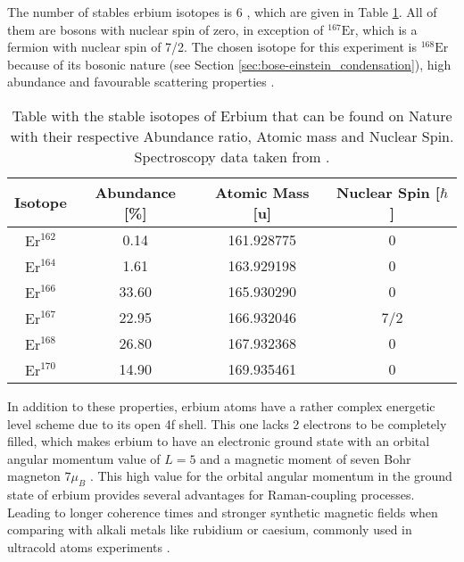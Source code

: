 The number of stables erbium isotopes is 6 , which are given in Table \ref{tab:Isotopes_Erbium}. All of them are bosons with nuclear spin of zero, in exception of $^{\text{167}}\text{Er}$, which is a fermion with nuclear spin of 7/2. The chosen isotope for this experiment is $^{\text{168}}\text{Er}$ because of its bosonic nature (see Section \ref{sec:bose-einstein_condensation}), high abundance and favourable scattering properties \cite{Frisch2014}.

\begin{table}[htbp] \centering
	\begin{tabular}{@{}c|c|c|c@{}}\hline
		Isotope                  & Abundance [\%]          & Atomic Mass [u] & Nuclear Spin [$\hbar$] \\ \hline\hline
		$\text{Er}^{\text{162}}$ &  0.14                   & 161.928775      & 0   \\
		$\text{Er}^{\text{164}}$ &  1.61                   & 163.929198      & 0   \\ 
		$\text{Er}^{\text{166}}$ & 33.60                   & 165.930290      & 0   \\
		$\text{Er}^{\text{167}}$ & 22.95                   & 166.932046      & 7/2   \\
		$\text{Er}^{\text{168}}$ & 26.80                   & 167.932368      & 0   \\  
		$\text{Er}^{\text{170}}$ & 14.90                   & 169.935461      & 0   \\  \hline
	\end{tabular}
	\caption[Table with the stable isotopes of Erbium]{Table with the stable isotopes of Erbium that can be found on Nature with their respective Abundance ratio, Atomic mass and Nuclear Spin. Spectroscopy data taken from \cite{sansonetti2005handbook}.}\label{tab:Isotopes_Erbium}
\end{table}

In addition to these properties, erbium atoms have a rather complex energetic level scheme due to its open 4f shell. This one lacks 2 electrons to be completely filled, which makes erbium to have an electronic ground state with an orbital angular momentum value of $L = 5$ and a magnetic moment of seven Bohr magneton $7\mu_B$ \cite{ban2005laser}. This high value for the orbital angular momentum in the ground state of erbium provides several advantages for Raman-coupling processes. Leading to longer coherence times and stronger synthetic magnetic fields when comparing with alkali metals like rubidium or caesium, commonly used in ultracold atoms experiments  \cite{cui2013synthetic}.



